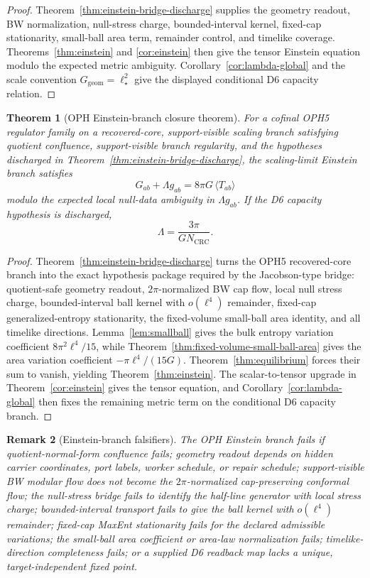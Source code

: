 \documentclass[11pt]{article}
\newtheorem{theorem}{Theorem}[section]
\newtheorem{remark}[theorem]{Remark}
\begin{document}
\begin{proof}
Theorem~\ref{thm:einstein-bridge-discharge} supplies the geometry readout, BW
normalization, null-stress charge, bounded-interval kernel, fixed-cap
stationarity, small-ball area term, remainder control, and timelike coverage.
Theorems~\ref{thm:einstein} and \ref{cor:einstein} then give the tensor
Einstein equation modulo the expected metric ambiguity.  Corollary~\ref{cor:lambda-global}
and the scale convention \(G_{\mathrm{geom}}=\ell_\star^2\) give the displayed
conditional D6 capacity relation.
\end{proof}

\begin{theorem}[OPH Einstein-branch closure theorem]\label{thm:oph-einstein-branch-closure}
For a cofinal OPH5 regulator family on a recovered-core, support-visible
scaling branch satisfying quotient confluence, support-visible branch
regularity, and the hypotheses discharged in
Theorem~\ref{thm:einstein-bridge-discharge}, the scaling-limit Einstein branch
satisfies
\[
G_{ab}+\Lambda g_{ab}=8\pi G\,\langle T_{ab}\rangle
\]
modulo the expected local null-data ambiguity in \(\Lambda g_{ab}\). If the D6
capacity hypothesis is discharged,
\[
\Lambda=\frac{3\pi}{G N_{\mathrm{CRC}}}.
\]
\end{theorem}

\begin{proof}
Theorem~\ref{thm:einstein-bridge-discharge} turns the OPH5 recovered-core
branch into the exact hypothesis package required by the Jacobson-type bridge:
quotient-safe geometry readout, \(2\pi\)-normalized BW cap flow, local null
stress charge, bounded-interval ball kernel with \(o(\ell^4)\) remainder,
fixed-cap generalized-entropy stationarity, the fixed-volume small-ball area
identity, and all timelike directions.  Lemma~\ref{lem:smallball} gives the
bulk entropy variation coefficient \(8\pi^2\ell^4/15\), while
Theorem~\ref{thm:fixed-volume-small-ball-area} gives the area variation
coefficient \(-\pi\ell^4/(15G)\).  Theorem~\ref{thm:equilibrium} forces their
sum to vanish, yielding Theorem~\ref{thm:einstein}.  The scalar-to-tensor
upgrade in Theorem~\ref{cor:einstein} gives the tensor equation, and
Corollary~\ref{cor:lambda-global} then fixes the remaining metric term on the conditional D6
capacity branch.
\end{proof}

\begin{remark}[Einstein-branch falsifiers]\label{rem:einstein-branch-falsifiers}
The OPH Einstein branch fails if quotient-normal-form confluence fails; geometry
readout depends on hidden carrier coordinates, port labels, worker schedule, or
repair schedule; support-visible BW modular flow does not become the
\(2\pi\)-normalized cap-preserving conformal flow; the null-stress bridge fails
to identify the half-line generator with local stress charge; bounded-interval
transport fails to give the ball kernel with \(o(\ell^4)\) remainder;
fixed-cap MaxEnt stationarity fails for the declared admissible variations; the
small-ball area coefficient or area-law normalization fails; timelike-direction
completeness fails; or a supplied D6 readback map lacks a unique, target-independent fixed point.
\end{remark}
\end{document}
